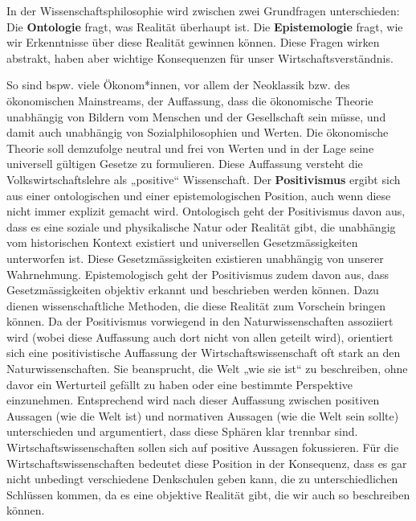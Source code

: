 \documentclass[
  nswissgerman,
  a4paper,
  DIV=11,
  numbers=noendperiod,
  oneside,
  openany]{scrreprt}
\begin{document}
In der Wissenschaftsphilosophie wird zwischen zwei Grundfragen
unterschieden: Die \textbf{Ontologie} fragt, was Realität überhaupt ist.
Die \textbf{Epistemologie} fragt, wie wir Erkenntnisse über diese
Realität gewinnen können. Diese Fragen wirken abstrakt, haben aber
wichtige Konsequenzen für unser Wirtschaftsverständnis.

So sind bspw. viele Ökonom*innen, vor allem der Neoklassik bzw. des
ökonomischen Mainstreams, der Auffassung, dass die ökonomische Theorie
unabhängig von Bildern vom Menschen und der Gesellschaft sein müsse, und
damit auch unabhängig von Sozialphilosophien und Werten. Die ökonomische
Theorie soll demzufolge neutral und frei von Werten und in der Lage
seine universell gültigen Gesetze zu formulieren. Diese Auffassung
versteht die Volkswirtschaftslehre als „positive`` Wissenschaft. Der
\textbf{Positivismus} ergibt sich aus einer ontologischen und einer
epistemologischen Position, auch wenn diese nicht immer explizit gemacht
wird. Ontologisch geht der Positivismus davon aus, dass es eine soziale
und physikalische Natur oder Realität gibt, die unabhängig vom
historischen Kontext existiert und universellen Gesetzmässigkeiten
unterworfen ist. Diese Gesetzmässigkeiten existieren unabhängig von
unserer Wahrnehmung. Epistemologisch geht der Positivismus zudem davon
aus, dass Gesetzmässigkeiten objektiv erkannt und beschrieben werden
können. Dazu dienen wissenschaftliche Methoden, die diese Realität zum
Vorschein bringen können. Da der Positivismus vorwiegend in den
Naturwissenschaften assoziiert wird (wobei diese Auffassung auch dort
nicht von allen geteilt wird), orientiert sich eine positivistische
Auffassung der Wirtschaftswissenschaft oft stark an den
Naturwissenschaften. Sie beansprucht, die Welt „wie sie ist`` zu
beschreiben, ohne davor ein Werturteil gefällt zu haben oder eine
bestimmte Perspektive einzunehmen. Entsprechend wird nach dieser
Auffassung zwischen positiven Aussagen (wie die Welt ist) und normativen
Aussagen (wie die Welt sein sollte) unterschieden und argumentiert, dass
diese Sphären klar trennbar sind. Wirtschaftswissenschaften sollen sich
auf positive Aussagen fokussieren. Für die Wirtschaftswissenschaften
bedeutet diese Position in der Konsequenz, dass es gar nicht unbedingt
verschiedene Denkschulen geben kann, die zu unterschiedlichen Schlüssen
kommen, da es eine objektive Realität gibt, die wir auch so beschreiben
können.
\end{document}
